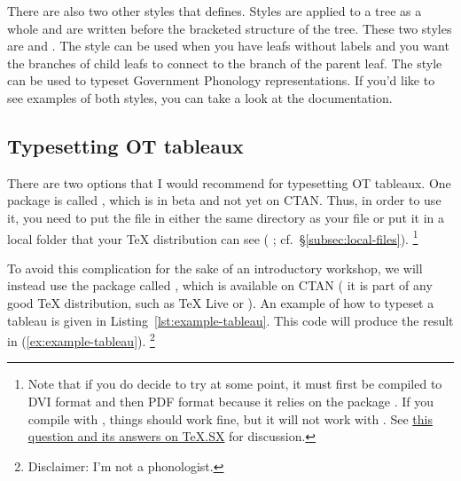 There are also two other styles that  defines.
Styles are applied to a tree as a whole and are written before the bracketed structure of the tree.
These two styles are  and .
The style  can be used when you have leafs without labels and you want the branches of child leafs to connect to the branch of the parent leaf.
The style  can be used to typeset Government Phonology representations.
If you'd like to see examples of both styles, you can take a look at the  documentation.

\subsection{Typesetting OT tableaux}
\label{subsec:typesetting-OT-tableaux}

There are two options that I would recommend for typesetting OT tableaux.
One package is called \href{http://sanders.phonologist.org/OTtablx/}{}, which is in beta and not yet on CTAN.
Thus, in order to use it, you need to put the  file in either the same directory as your  file or put it in a local folder that your \TeX{} distribution can see (\IE{} ; cf.~\S\ref{subsec:local-files}).%
\footnote{%
Note that if you do decide to try  at some point, it must first be compiled to DVI format and then PDF format because it relies on the package .
If you compile with , things should work fine, but it will not work with .
See \href{http://tex.stackexchange.com/q/8413/32888}{this question and its answers on TeX.SX} for discussion.%
}

To avoid this complication for the sake of an introductory workshop, we will instead use the package called , which is available on CTAN (\IE{} it is part of any good \TeX{} distribution, such as TeX Live or ).
An example of how to typeset a tableau is given in Listing~\ref{lst:example-tableau}.
This code will produce the result in (\ref{ex:example-tableau}).%
\footnote{%
Disclaimer: I'm not a phonologist.%
}

\begin{exe}
    \label{ex:example-tableau}
\end{exe}

